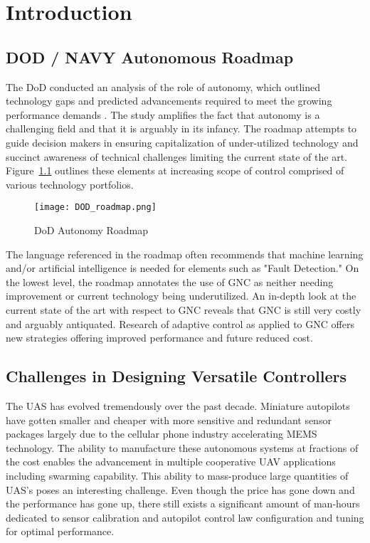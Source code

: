 \chapter{Introduction}\label{ch:intro}

\section{DOD / NAVY Autonomous Roadmap}
The \ac{DoD} conducted an analysis of the role of autonomy, which outlined technology gaps and predicted advancements required to meet the growing performance demands \cite{dodroadmap}.  The study amplifies the fact that autonomy is a challenging field and that it is arguably in its infancy.  The roadmap attempts to guide decision makers in ensuring capitalization of under-utilized technology and succinct awareness of technical challenges limiting the current state of the art.  Figure~\ref{fig:dod_roadmap} outlines these elements at increasing scope of control comprised of various technology portfolios.  
\begin{figure}[h!]
 \centering
  \texttt{[image: DOD\_roadmap.png]}
  \caption{DoD Autonomy Roadmap \cite{dodroadmap}}
  \label{fig:dod_roadmap}
\end{figure}
The language referenced in the roadmap often recommends that machine learning and/or artificial intelligence is needed for elements such as "Fault Detection."  On the lowest level, the roadmap annotates the use of \ac{GNC} as neither needing improvement or current technology being underutilized.  An in-depth look at the current state of the art with respect to \ac{GNC} reveals that \ac{GNC} is still very costly and arguably antiquated.  Research of adaptive control as applied to \ac{GNC} offers new strategies offering improved performance and future reduced cost.

\section{Challenges in Designing Versatile Controllers}
The \ac{UAS} has evolved tremendously over the past decade.  Miniature autopilots have gotten smaller and cheaper with more sensitive and redundant sensor packages largely due to the cellular phone industry accelerating \ac{MEMS} technology.  The ability to manufacture these autonomous systems at fractions of the cost enables the advancement in multiple cooperative UAV applications including swarming capability.  This ability to mass-produce large quantities of \ac{UAS}'s poses an interesting challenge.  Even though the price has gone down and the performance has gone up, there still exists a significant amount of man-hours dedicated to sensor calibration and autopilot control law configuration and tuning for optimal performance.  


